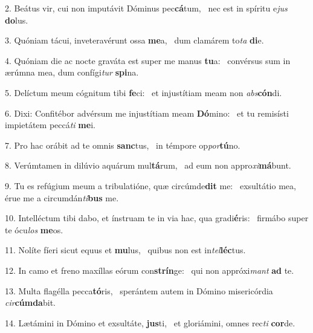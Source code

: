 2. Beátus vir, cui non imputávit Dóminus pec\textbf{cá}tum, \ast\  nec est in spíritu e\textit{jus} \textbf{do}lus.\

3. Quóniam tácui, inveteravérunt ossa \textbf{me}a, \ast\  dum clamárem to\textit{ta} \textbf{di}e.\

4. Quóniam die ac nocte graváta est super me manus \textbf{tu}a: \ast\  convérsus sum in ærúmna mea, dum confígi\textit{tur} \textbf{spi}na.\

5. Delíctum meum cógnitum tibi \textbf{fe}ci: \ast\  et injustítiam meam non \textit{abs}\textbf{cón}di.\

6. Dixi: Confitébor advérsum me injustítiam meam \textbf{Dó}mino: \ast\  et tu remisísti impietátem peccá\textit{ti} \textbf{me}i.\

7. Pro hac orábit ad te omnis \textbf{sanc}tus, \ast\  in témpore op\textit{por}\textbf{tú}no.\

8. Verúmtamen in dilúvio aquárum mul\textbf{tá}rum, \ast\  ad eum non appro\textit{xi}\textbf{má}bunt.\

9. Tu es refúgium meum a tribulatióne, quæ circúmde\textbf{dit} me: \ast\  exsultátio mea, érue me a circumdán\textit{ti}\textbf{bus} me.\

10. Intelléctum tibi dabo, et ínstruam te in via hac, qua gradi\textbf{é}ris: \ast\  firmábo super te ócu\textit{los} \textbf{me}os.\

11. Nolíte fíeri sicut equus et \textbf{mu}lus, \ast\  quibus non est in\textit{tel}\textbf{léc}tus.\

12. In camo et freno maxíllas eórum con\textbf{strín}ge: \ast\  qui non appróxi\textit{mant} \textbf{ad} te.\

13. Multa flagélla pecca\textbf{tó}ris, \ast\  sperántem autem in Dómino misericórdia \textit{cir}\textbf{cúm}\textbf{da}bit.\

14. Lætámini in Dómino et exsultáte, \textbf{jus}ti, \ast\  et gloriámini, omnes rec\textit{ti} \textbf{cor}de.\

